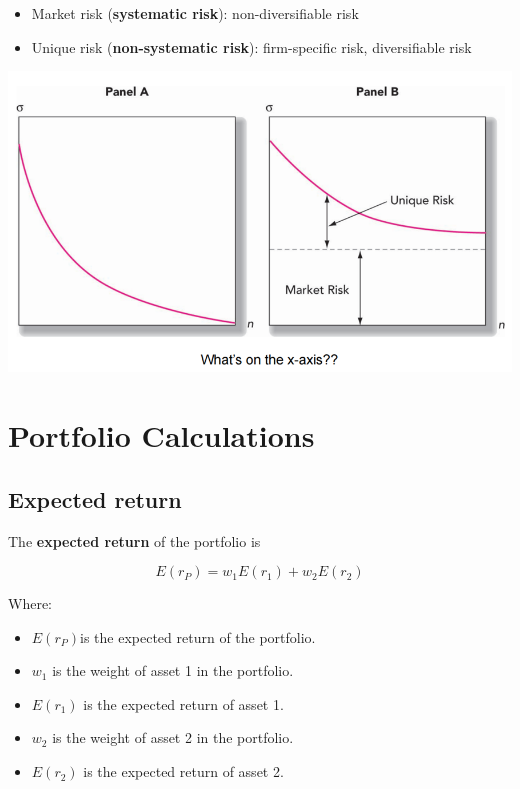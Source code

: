 \documentclass[
]{book}
\providecommand{\tightlist}{%
  \setlength{\itemsep}{0pt}\setlength{\parskip}{0pt}}
\begin{document}
\begin{itemize}
\tightlist
\item
  Market risk (\textbf{systematic risk}): non-diversifiable risk
\item
  Unique risk (\textbf{non-systematic risk}): firm-specific risk, diversifiable risk
\end{itemize}

\includegraphics{Resources/sysrisk.png}

\hypertarget{portfolio-calculations}{%
\section{Portfolio Calculations}\label{portfolio-calculations}}

\hypertarget{expected-return-1}{%
\subsection{Expected return}\label{expected-return-1}}

The \textbf{expected return} of the portfolio is

\[ E(r_P) = w_1 E(r_1) + w_2 E(r_2) \]

Where:

\begin{itemize}
\tightlist
\item
  \(E(r_P)\)is the expected return of the portfolio.
\item
  \(w_1\) is the weight of asset 1 in the portfolio.
\item
  \(E(r_1)\) is the expected return of asset 1.
\item
  \(w_2\) is the weight of asset 2 in the portfolio.
\item
  \(E(r_2)\) is the expected return of asset 2.
\end{itemize}
\end{document}
